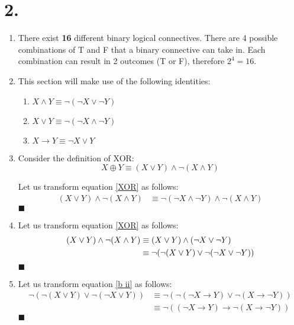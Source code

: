 \documentclass[12pt]{article}
\newcommand{\p}[1]{\item[\textnormal{(#1)}]}
\newcommand{\q}{\hfill $\blacksquare$}
\newenvironment{ps}
{\begin{enumerate}[leftmargin=0em, itemindent=1.5em]}
{\end{enumerate}}
\begin{document}
\section*{2.}
\begin{ps}

    \p{a} There exist \textbf{16} different binary logical connectives. There are
    4 possible combinations of T and F that a binary connective can take in. Each
    combination can result in 2 outcomes (T or F), therefore \(2^4 = 16\).


    \p{b} This section will make use of the following identities:

        \begin{enumerate}[label=\arabic*.]
            \item \( X \wedge Y \equiv \neg(\neg X \vee \neg Y) \)
            \item \( X \vee Y \equiv \neg(\neg X \wedge \neg Y) \)
            \item \( X \rightarrow Y \equiv \neg X \vee Y \)
        \end{enumerate}

    \p{i} Consider the definition of XOR: 
        \begin{equation}
            \label{XOR}
            X \oplus Y \equiv (X \vee Y) \wedge \neg(X \wedge Y)
        \end{equation}

        Let us transform equation \eqref{XOR} as follows:
        \begin{align*}
            (X \vee Y) \wedge \neg(X \wedge Y) &\equiv \neg(\neg X \wedge \neg Y) \wedge \neg (X
                                                \wedge Y)
        \end{align*} \q

    \p{ii} Let us transform equation \eqref{XOR} as follows: 
        \begin{align}
            \label{b ii}
            (X \vee Y) \wedge \neg(X \wedge Y) &\equiv (X \vee Y) \wedge (\neg X \vee \neg Y) \notag \\
                                               &\equiv \neg (\neg (X \vee Y) \vee \neg (\neg X
                                               \vee \neg Y ))
        \end{align} \q

    \p{iii} Let us transform equation \eqref{b ii} as follows: 
        \begin{align*}
            \neg (\neg (X \vee Y) \vee \neg (\neg X \vee Y )) &\equiv \neg(\neg(\neg X \rightarrow
            Y) \vee \neg(X \rightarrow \neg Y)) \\
            &\equiv \neg ((\neg X \rightarrow Y) \rightarrow \neg (X \rightarrow \neg Y))
        \end{align*} \q


\end{ps}
\end{document}
